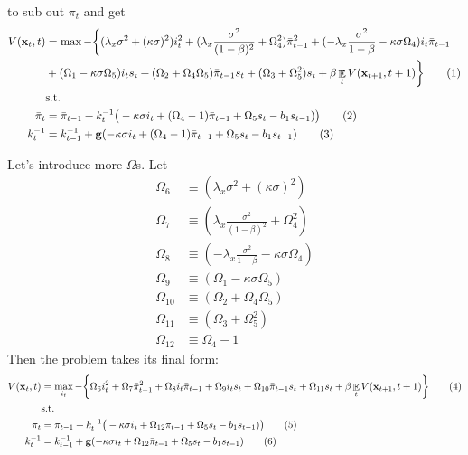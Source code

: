 \documentclass[11pt]{article}
\renewcommand{\[}{\begin{equation}}
\renewcommand{\]}{\end{equation}}
\DeclareMathOperator{\E}{\mathbb{E}}
\newcommand\numberthis{\addtocounter{equation}{1}\tag{\theequation}} %
\begin{document}
to sub out $\pi_t$ and get
\begin{align*}
V(\mathbf{x}_t,t)& = \max -\bigg\{ (\lambda_x\sigma^2 +(\kappa\sigma)^2)i_t^2 +(\lambda_x\frac{\sigma^2}{(1-\beta)^2} + \Omega_4^2)\bar{\pi}_{t-1}^2 +(-\lambda_x\frac{\sigma^2}{1-\beta} -\kappa\sigma\Omega_4 )i_t \bar{\pi}_{t-1} \\
&+(\Omega_1-\kappa\sigma\Omega_5)i_ts_t + (\Omega_2+\Omega_4\Omega_5)\bar{\pi}_{t-1}s_t +(\Omega_3+\Omega_5^2)s_t + \beta \E_t V(\mathbf{x}_{t+1},t+1) \bigg\} \numberthis \\
& \text{s.t.} \\
 \bar{\pi}_{t} & = \bar{\pi}_{t-1} + k_t^{-1}\big(-\kappa\sigma i_t +(\Omega_4-1)\bar{\pi}_{t-1}  +\Omega_5 s_t-b_1 s_{t-1}) \big)   \numberthis  \\
 k_t^{-1} & = k_{t-1}^{-1}+ \mathbf{g}(-\kappa\sigma i_t +(\Omega_4-1)\bar{\pi}_{t-1}  +\Omega_5 s_t-b_1 s_{t-1})  \numberthis
\end{align*}

Let's introduce more $\Omega$s. Let
\begin{align}
\Omega_6 & \equiv (\lambda_x\sigma^2 +(\kappa\sigma)^2) \\
\Omega_7 & \equiv (\lambda_x\frac{\sigma^2}{(1-\beta)^2} + \Omega_4^2) \\
\Omega_8 & \equiv (-\lambda_x\frac{\sigma^2}{1-\beta} -\kappa\sigma\Omega_4 )\\
\Omega_9 &\equiv  (\Omega_1-\kappa\sigma\Omega_5) \\
\Omega_{10} &\equiv  (\Omega_2+\Omega_4\Omega_5) \\
\Omega_{11} &     \equiv (\Omega_3+\Omega_5^2) \\
\Omega_{12} &     \equiv \Omega_4-1
\end{align}
Then the problem takes its final form:
\begin{align*}
V(\mathbf{x}_t,t)& = \max_{i_t} -\bigg\{ \Omega_6 i_t^2 +\Omega_7\bar{\pi}_{t-1}^2 +\Omega_8i_t \bar{\pi}_{t-1} +\Omega_9i_ts_t + \Omega_{10}\bar{\pi}_{t-1}s_t +\Omega_{11}s_t + \beta \E_t V(\mathbf{x}_{t+1},t+1) \bigg\} \numberthis \\
& \text{s.t.} \\
 \bar{\pi}_{t} & = \bar{\pi}_{t-1} + k_t^{-1}\big(-\kappa\sigma i_t +\Omega_{12}\bar{\pi}_{t-1}  +\Omega_5 s_t-b_1 s_{t-1}) \big)   \numberthis  \\
 k_t^{-1} & = k_{t-1}^{-1}+ \mathbf{g}(-\kappa\sigma i_t +\Omega_{12}\bar{\pi}_{t-1}  +\Omega_5 s_t-b_1 s_{t-1})  \numberthis
\end{align*}
\end{document}
